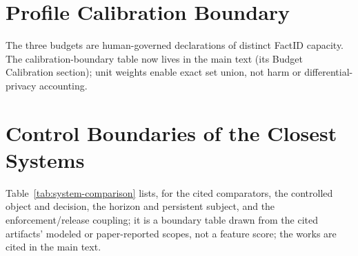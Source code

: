 \documentclass[journal,onecolumn]{IEEEtran}
\begin{document}
\section{Profile Calibration Boundary}

The three budgets are human-governed declarations of distinct FactID capacity.
The calibration-boundary table now lives in the main text (its Budget
Calibration section); unit weights enable exact set union, not harm or
differential-privacy accounting.

\section{Control Boundaries of the Closest Systems}
\label{sec:system-comparison-supp}

Table~\ref{tab:system-comparison} lists, for the cited comparators, the controlled object and decision, the horizon and persistent subject, and the enforcement/release coupling; it is a boundary table drawn from the cited artifacts' modeled or paper-reported scopes, not a feature score; the works are cited in the main text.
\end{document}
